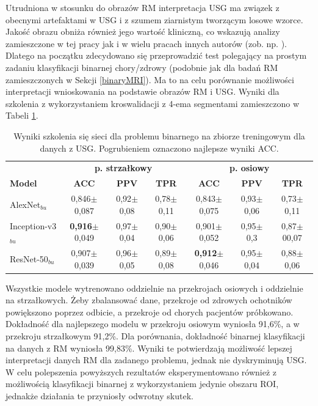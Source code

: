 Utrudniona w stosunku do obrazów RM interpretacja USG ma związek z obecnymi artefaktami w USG i z szumem ziarnistym tworzącym losowe wzorce. Jakość obrazu obniża również jego wartość kliniczną, co wskazują analizy zamieszczone w tej pracy jak i w wielu pracach innych autorów (zob. np. \cite{Khan2003, Ibrahim2013}). Dlatego na początku zdecydowano się przeprowadzić test polegający na prostym zadaniu klasyfikacji binarnej chory/zdrowy (podobnie jak dla badań RM zamieszczonych w Sekcji \ref{binaryMRI}). Ma to na celu porównanie możliwości interpretacji wnioskowania na podstawie obrazów RM i USG. Wyniki dla szkolenia z wykorzystaniem kroswalidacji z 4-ema segmentami zamieszczono w Tabeli \ref{tab:usg-binary}.
\renewcommand{\arraystretch}{1.2}
\begin{table}[]
	\centering
	\scriptsize
	\setlength{\tabcolsep}{3pt}
	\setlength\extrarowheight{2pt}
	\caption{Wyniki szkolenia się sieci dla problemu binarnego na zbiorze treningowym dla danych z USG. Pogrubieniem oznaczono najlepsze wyniki ACC.}
	\label{tab:usg-binary}
	\begin{tabular}{l||c|c|c||c|c|c}
		& \multicolumn{3}{c}{\textbf{p. strzałkowy}} & \multicolumn{3}{c}{\textbf{p. osiowy}} \\
		\textbf{Model} & \textbf{ACC} & \textbf{PPV} & \textbf{TPR} & \textbf{ACC} & \textbf{PPV} & \textbf{TPR} \\ \hline \hline
		AlexNet$_{bu}$ & 0,846$\pm$0,087 & 0,92$\pm$0,08 & 0,78$\pm$0,11 & 0,843$\pm$0,075 & 0,93$\pm$0,06 & 0,73$\pm$0,11  \\ \hline
		Inception-v3$_{bu}$ & \textbf{0,916}$\pm$0,049 & 0,97$\pm$0,04 & 0,90$\pm$0,06 & 0,901$\pm$0,052 & 0,95$\pm$0,3 & 0,87$\pm$00,07 \\ \hline
		ResNet-50$_{bu}$ & 0,907$\pm$0,039 & 0,96$\pm$0,05 & 0,89$\pm$0,08 & \textbf{0,912}$\pm$0,046 & 0,95$\pm$0,04 & 0,88$\pm$0,06 \\ 
	\end{tabular}
\end{table}
\renewcommand{\arraystretch}{1}

Wszystkie modele wytrenowano oddzielnie na przekrojach osiowych i oddzielnie na strzałkowych. Żeby zbalansować dane, przekroje od zdrowych ochotników powiększono poprzez odbicie, a przekroje od chorych pacjentów próbkowano. Dokładność dla najlepszego modelu w przekroju osiowym wyniosła 91,6\%, a w przekroju strzałkowym 91,2\%. Dla porównania, dokładność binarnej klasyfikacji na danych z RM wyniosła 99,83\%. Wyniki te potwierdzają możliwość lepszej interpretacji danych RM dla zadanego problemu, jednak nie dyskryminują USG. W celu polepszenia powyższych rezultatów eksperymentowano również z możliwością klasyfikacji binarnej z wykorzystaniem jedynie obszaru ROI, jednakże działania te przyniosły odwrotny skutek.  

